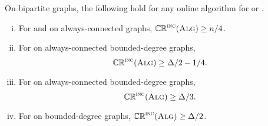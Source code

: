 \begin{proposition}
\label{prop:bip-2layers}
On bipartite graphs, the following hold for any online algorithm \A
for \ds or \cds.
\begin{enumerate}[(i)]
\item \label{bip:n}
 For \ds and \cds on always-connected graphs, $\mathbb{CR}^{\textsc{\ensuremath{\text{inc}}}}(\operatorname{\textsc{Alg}})\ge n/4$.
\item \label{bip:deltaac}
 For \ds on always-connected bounded-degree graphs, $$\mathbb{CR}^{\textsc{\ensuremath{\text{inc}}}}(\operatorname{\textsc{Alg}}) \ge
 \Delta/2-1/4.$$
\item \label{bip:deltaaccds}
 For \cds on always-connected bounded-degree graphs, $$\mathbb{CR}^{\textsc{\ensuremath{\text{inc}}}}(\operatorname{\textsc{Alg}}) \ge \Delta/3.$$ 
\item \label{bip:delta}
 For \cds on bounded-degree graphs, $\mathbb{CR}^{\textsc{\ensuremath{\text{inc}}}}(\operatorname{\textsc{Alg}})\ge \Delta/2$.
\end{enumerate}
\end{proposition}
